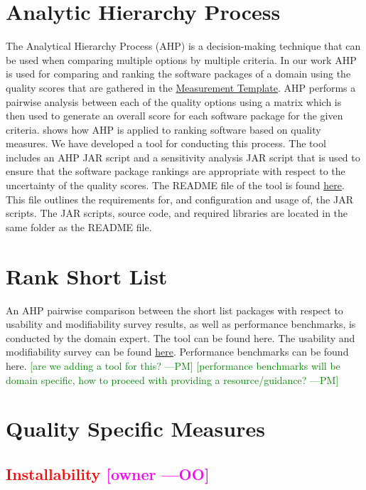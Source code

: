\documentclass[letterpaper,cleveref]{lipics-v2019}
\newcommand{\authornote}[3]{\textcolor{#1}{[#3 ---#2]}}
\newcommand{\authornote}[3]{}
\newcommand{\oo}[1]{\authornote{magenta}{OO}{#1}} %
\newcommand{\pmi}[1]{\authornote{green}{PM}{#1}} %
\newcommand{\notdone}[1]{\textcolor{red}{#1}}
\theoremstyle{definition}
\begin{document}
\section{Analytic Hierarchy Process} \label{SecAHP}
The Analytical Hierarchy Process (AHP) is a decision-making technique that can be used when comparing multiple options by multiple criteria. In our work AHP is used for comparing and ranking the software packages of a domain using the quality scores that are gathered in the \href{https://github.com/smiths/AIMSS/blob/master/StateOfPractice/Methodology/Combined_MeasurementTemplate_EmpiricalMeasures.xlsx}{Measurement Template}. AHP performs a pairwise analysis between each of the quality options using a matrix which is then used to generate an overall score for each software package for the given criteria. \cite{SmithEtAl2016} shows how AHP is applied to ranking software based on quality measures. We have developed a tool for conducting this process. The tool includes an AHP JAR script and a sensitivity analysis JAR script that is used to ensure that the software package rankings are appropriate with respect to the uncertainty of the quality scores. The README file of the tool is found \href{https://github.com/smiths/AIMSS/blob/master/StateOfPractice/AHP2020/LBM/README.txt}{here}. This file outlines the requirements for, and configuration and usage of, the JAR scripts. The JAR scripts, source code, and required libraries are located in the same folder as the README file.

\section{Rank Short List} \label{SecRankShortList}
An AHP pairwise comparison between the short list packages with respect to usability and modifiability survey results, as well as performance benchmarks, is conducted by the domain expert. The tool can be found here. The usability and modifiability survey can be found \href{https://github.com/smiths/AIMSS/blob/master/StateOfPractice/Methodology/Experiments.pdf}{here}. Performance benchmarks can be found here.
\pmi{are we adding a tool for this?}
\pmi{performance benchmarks will be domain specific, how to proceed with providing a resource/guidance?}

\section{Quality Specific Measures}

\subsection{\notdone{Installability} \oo{owner}}
\end{document}
